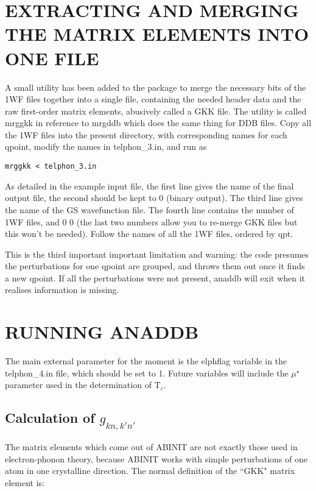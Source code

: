 \documentclass[aps,preprint]{revtex4}
\begin{document}
\section{EXTRACTING AND MERGING THE MATRIX ELEMENTS INTO ONE FILE}

A small utility has been added to the package to merge the necessary bits of
the 1WF files together into a single file, containing the needed header data
and the raw first-order matrix elements, abusively called a GKK file. The
utility is called mrggkk in reference to mrgddb which does the same thing for
DDB files. Copy all the 1WF files into the present directory, with
corresponding names for each qpoint, modify the names in telphon\_3.in, and run
as
\begin{verbatim}
mrggkk < telphon_3.in
\end{verbatim}

As detailed in the example input file, the first line gives the name of the
final output file, the second should be kept to 0 (binary output). The third
line gives the name of the GS wavefunction file.  The fourth line contains the
number of 1WF files, and 0 0 (the last two numbers allow you to re-merge GKK
files but this won't be needed). Follow the names of all the 1WF files,
ordered by qpt.

This is the third important important limitation and warning: the code
presumes the perturbations for one qpoint are grouped, and throws them out
once it finds a new qpoint. If all the perturbations were not present, anaddb
will exit when it realises information is missing.

\section{RUNNING ANADDB}

The main external parameter for the moment is the elphflag variable in the
telphon\_4.in file, which should be set to 1. Future variables will include the
$\mu^{\star}$ parameter used in the determination of T$_c$.

\subsection{Calculation of $g_{kn,k'n'}$}
The matrix elements which come out of ABINIT are not exactly those used in
electron-phonon theory, because ABINIT works with simple perturbations of one
atom in one crystalline direction. The normal definition of the ``GKK" matrix
element is:
\end{document}
